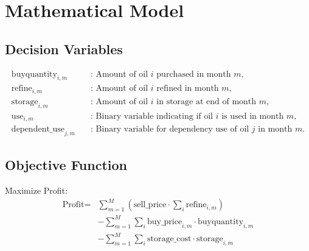 \documentclass{article}
\begin{document}
\section*{Mathematical Model}

\subsection*{Decision Variables}
\begin{align*}
\text{buyquantity}_{i, m} & \quad \text{: Amount of oil } i \text{ purchased in month } m, \\
\text{refine}_{i, m} & \quad \text{: Amount of oil } i \text{ refined in month } m, \\
\text{storage}_{i, m} & \quad \text{: Amount of oil } i \text{ in storage at end of month } m, \\
\text{use}_{i, m} & \quad \text{: Binary variable indicating if oil } i \text{ is used in month } m, \\
\text{dependent\_use}_{j, m} & \quad \text{: Binary variable for dependency use of oil } j \text{ in month } m.
\end{align*}

\subsection*{Objective Function}
Maximize Profit:
\begin{align*}
\text{Profit} = & \sum_{m=1}^{M} \left( \text{sell\_price} \cdot \sum_{i} \text{refine}_{i, m} \right) \\
& - \sum_{m=1}^{M} \sum_{i} \text{buy\_price}_{i, m} \cdot \text{buyquantity}_{i, m} \\
& - \sum_{m=1}^{M} \sum_{i} \text{storage\_cost} \cdot \text{storage}_{i, m}
\end{align*}
\end{document}
